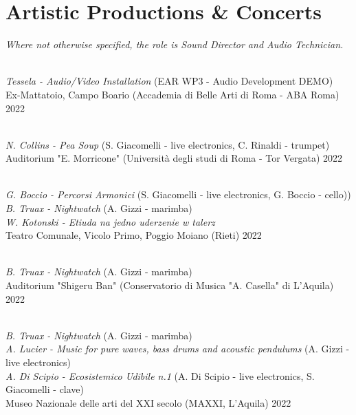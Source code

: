\section{\textbf{Artistic Productions \& Concerts}}
\vspace{-0.4mm}
{\color{gray} \small \textit{Where not otherwise specified, the role is Sound Director and Audio Technician.}}
\resumeSubHeadingListStart

    {\\\textit{Tessela - Audio/Video Installation} (EAR WP3 - Audio Development DEMO)\\ 
    Ex-Mattatoio, Campo Boario (Accademia di Belle Arti di Roma - ABA Roma)}
    {2022}

    {\\\textit{N. Collins - Pea Soup} (S. Giacomelli - live electronics, C. Rinaldi - trumpet)\\ 
    Auditorium "E. Morricone" (Università degli studi di Roma - Tor Vergata)}
    {2022}

    {\\\textit{G. Boccio - Percorsi Armonici} (S. Giacomelli - live electronics, G. Boccio - cello))\\
    \textit{B. Truax - Nightwatch} (A. Gizzi - marimba)\\
    \textit{W. Kotonski - Etiuda na jedno uderzenie w talerz}\\
    Teatro Comunale, Vicolo Primo, Poggio Moiano (Rieti)}
    {2022}

    {\\\textit{B. Truax - Nightwatch} (A. Gizzi - marimba)\\
    Auditorium "Shigeru Ban" (Conservatorio di Musica "A. Casella" di L'Aquila)}
    {2022}

    {\\\textit{B. Truax - Nightwatch} (A. Gizzi - marimba)\\
    \textit{A. Lucier - Music for pure waves, bass drums and acoustic pendulums} (A. Gizzi - live electronics)\\
    \textit{A. Di Scipio - Ecosistemico Udibile n.1} (A. Di Scipio - live electronics, S. Giacomelli - clave)\\
    Museo Nazionale delle arti del XXI secolo (MAXXI, L'Aquila)}
    {2022}

